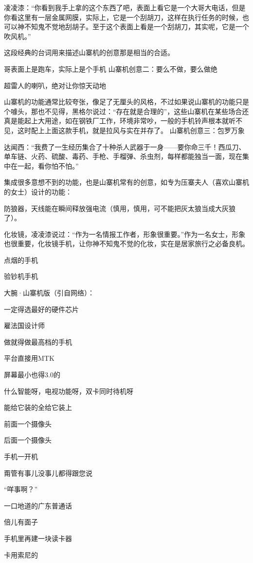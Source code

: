 \documentclass[12pt,UTF8]{ctexbook}
\begin{document}
凌凌漆：“你看到我手上拿的这个东西了吧，表面上看它是一个大哥大电话，但是你看这里有一层金属网膜，实际上，它是一个刮胡刀，这样在执行任务的时候，也可以神不知鬼不觉地刮胡子。至于这个表面上看是一个刮胡刀，其实呢，它是一个吹风机。”

这段经典的台词用来描述山寨机的创意那是相当的合适。

哥表面上是跑车，实际上是个手机
山寨机创意二：要么不做，要么做绝

超雷人的喇叭，绝对让你惊天动地

山寨机的功能通常比较夸张，像足了无厘头的风格，不过如果说山寨机的功能只是个噱头，那也不见得，黑格尔说过：“存在就是合理的”，这些山寨机在某些场合还真是能起上大用途，如在钢铁厂工作，环境非常吵，一般的手机铃声根本就听不见，这时配上上面这款手机，就是拉风与实在并存了。
山寨机创意三：包罗万象

达闻西：“我费了一生经历集合了十种杀人武器于一身——要你命三千！西瓜刀、单车链、火药、硫酸、毒药、手枪、手榴弹、杀虫剂，每样都能独当一面，现在集中在一起，看你怕不怕。”

集成很多意想不到的功能，也是山寨机常有的创意，如专为压寨夫人（喜欢山寨机的女士）设计的功能：

防狼器，天线能在瞬间释放强电流（慎用，慎用，可不能把灰太狼当成大灰狼了）。

化妆镜，凌凌漆说过：“作为一名情报工作者，形象很重要。”作为一名女士，形象也很重要，化妆镜手机，让你神不知鬼不觉的化妆，实在是居家旅行之必备良机。

点烟的手机

验钞机手机

大腕·山寨机版（引自网络）：

一定得选最好的硬件芯片

雇法国设计师

做就得做最高档的手机

平台直接用MTK

屏幕最小也得3.0的

什么智能呀，电视功能呀，双卡同时待机呀

能给它装的全给它装上

前面一个摄像头

后面一个摄像头

手机一开机

甭管有事儿没事儿都得跟您说

“咩事啊？”

一口地道的广东普通话

倍儿有面子

手机里再建一块读卡器

卡用索尼的
\end{document}
